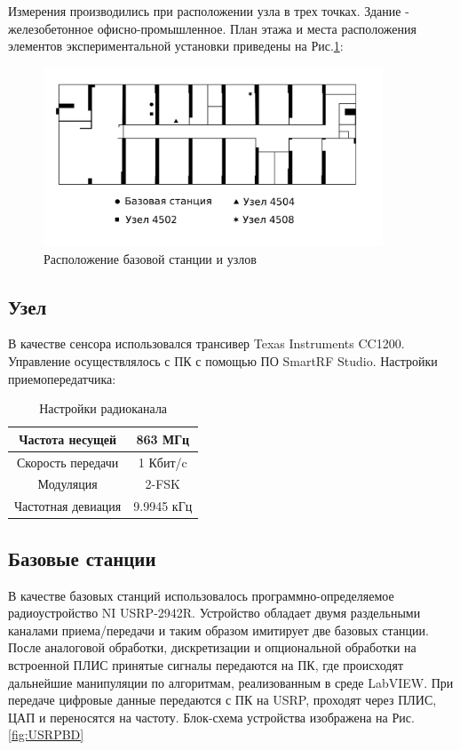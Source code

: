 \documentclass[a4paper,12pt,oneside, abstract=true]{scrartcl}
\begin{document}
Измерения производились при расположении узла в трех точках. Здание - железобетонное офисно-промышленное.
План этажа и места расположения элементов экспериментальной установки приведены на Рис.\ref{fig:StagePlan}:
 
\begin{figure}[!htb]
    \centering
    \includegraphics[width=0.9\textwidth]{pics/plan.png}
    \caption{Расположение базовой станции и узлов}
    \label{fig:StagePlan}
\end{figure}

\subsection{Узел}

В качестве сенсора использовался трансивер Texas Instruments CC1200. 
Управление осуществлялось с ПК с помощью ПО SmartRF Studio. 
Настройки приемопередатчика:

\begin{table}[htb!]
\centering
\caption{Настройки радиоканала}
\label{table:ccconfig}
\begin{tabular}{|c|c|}
\hline
Частота несущей & 863 МГц \\
\hline
Скорость передачи & 1 Кбит/c \\
\hline
Модуляция & 2-FSK\\
\hline
Частотная девиация & 9.9945 кГц\\
\hline
\end{tabular}
\end{table}

\subsection{Базовые станции}

В качестве базовых станций использовалось программно-определяемое радиоустройство NI USRP-2942R. Устройство обладает двумя раздельными каналами приема/передачи и таким образом имитирует две базовых станции. 
После аналоговой обработки, дискретизации и опциональной обработки на встроенной ПЛИС принятые сигналы передаются на ПК, где происходят дальнейшие манипуляции по алгоритмам, реализованным в среде LabVIEW. 
При передаче цифровые данные передаются с ПК на USRP, проходят через ПЛИС, ЦАП и переносятся на частоту. 
Блок-схема устройства изображена на Рис.\ref{fig:USRPBD}
\end{document}
